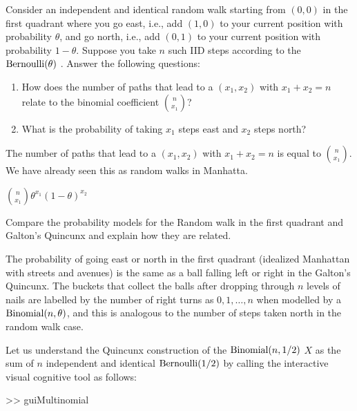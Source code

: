 \begin{Exercise}[title={Random walk in the first Quadrant},label={xRWsinIQ}]
Consider an independent and identical random walk starting from $(0,0)$ in the first quadrant where you go east, 
i.e., add $(1,0)$ to your current position with probability $\theta$, and go north, i.e., add $(0,1)$ to your current position with probability $1-\theta$. 
Suppose you take $n$ such IID steps according to the $\mbox{{\rm Bernoulli}}(\theta)$ \rv.  
Answer the following questions:
\begin{enumerate}
\item How does the number of paths that lead to a $(x_1,x_2)$ with $x_1+x_2=n$ relate to the binomial coefficient $\binom{n}{x_1}$? 
\item What is the probability of taking $x_1$ steps east and $x_2$ steps north?
\end{enumerate}
\end{Exercise}

\begin{Answer}
\bit
\item The number of paths that lead to a $(x_1,x_2)$ with $x_1+x_2=n$ is equal to $\binom{n}{x_1}$. We have already seen this as random walks in Manhatta. 
\item $\binom{n}{x_1} \theta^{x_1}(1-\theta)^{x_2}$
\eit
\end{Answer}

\begin{Exercise}[title={Random walks in  the first Quadrant and Galton's Quincunx},label={xRWsinIQAndQunicux}]
Compare the probability models for the Random walk in the first quadrant and Galton's Quincunx and explain how they are related.
\end{Exercise}
\begin{Answer}
The probability of going east or north in the first quadrant (idealized Manhattan with streets and avenues) is the same as a ball falling left or right in the Galton's Quincunx. 
The buckets that collect the balls after dropping through $n$ levels of nails are labelled by the number of right turns as $0, 1, \ldots, n$ when modelled by a $\mbox{{\rm Binomial}}(n,\theta)$, and this is analogous to the number of steps taken north in the random walk case.
\end{Answer}

\begin{labwork}\label{LW:QuincunxSampler}
{\rm Let us understand the Quincunx construction of the $\mbox{{\rm Binomial}}(n,1/2)$ \rv $X$ as the sum of $n$ independent and identical $\mbox{{\rm Bernoulli}}(1/2)$  by calling the interactive visual cognitive tool as follows:
\begin{VrbM}
>> guiMultinomial
\end{VrbM}
}
\end{labwork}

